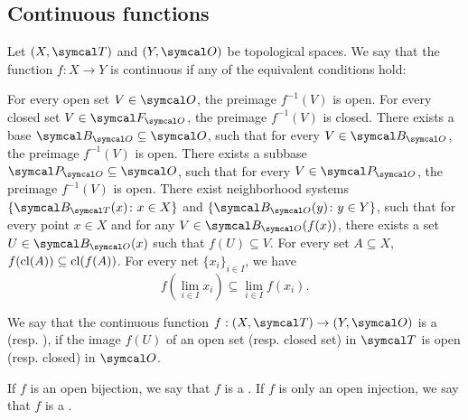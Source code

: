 \subsection{Continuous functions}\label{subsec:continuous_functions}

\begin{definition}\label{def:continuous_function}
  Let \( (X, \Cal{T}) \) and \( (Y, \Cal{O}) \) be topological spaces. We say that the function \( f: X \to Y \) is continuous if any of the equivalent conditions hold:
  \begin{defenum}
     For every open set \( V \in \Cal{O} \), the preimage \( f^{-1}(V) \) is open.
     For every closed set \( V \in \Cal{F}_{\Cal{O}} \), the preimage \( f^{-1}(V) \) is closed.
     There exists a base \( \Cal{B}_{\Cal{O}} \subseteq \Cal{O} \), such that for every \( V \in \Cal{B}_{\Cal{O}} \), the preimage \( f^{-1}(V) \) is open.
     There exists a subbase \( \Cal{P}_{\Cal{O}} \subseteq \Cal{O} \), such that for every \( V \in \Cal{P}_{\Cal{O}} \), the preimage \( f^{-1}(V) \) is open.
     There exist neighborhood systems \( \{ \Cal{B}_{\Cal{T}}(x) \colon x \in X \} \) and \( \{ \Cal{B}_{\Cal{O}}(y) \colon y \in Y \} \), such that for every point \( x \in X \) and for any \( V \in \Cal{B}_{\Cal{O}}(f(x)) \), there exists a set \( U \in \Cal{B}_{\Cal{O}}(x) \) such that \( f(U) \subseteq V \).
     For every set \( A \subseteq X \), \( f(\operatorname{cl}(A)) \subseteq \operatorname{cl}(f(A)) \).
     For every net \( \{ x_i \}_{i \in I} \), we have
    \begin{equation*}
      f\left(\lim_{i \in I} x_i \right) \subseteq \lim_{i \in I} f(x_i).
    \end{equation*}
  \end{defenum}
\end{definition}

\begin{definition}\label{def:homeomorphism}
  We say that the continuous function \( f: (X, \Cal{T}) \to (Y, \Cal{O}) \) is a  (resp. ), if the image \( f(U) \) of an open set (resp. closed set) in \( \Cal{T} \) is open (resp. closed) in \( \Cal{O} \).

  If \( f \) is an open bijection, we say that \( f \) is a . If \( f \) is only an open injection, we say that \( f \) is a .
\end{definition}


